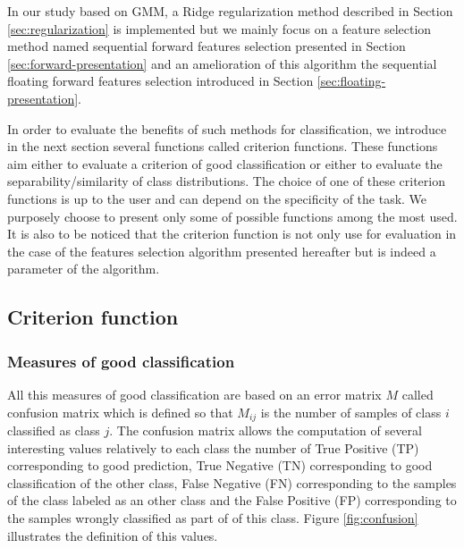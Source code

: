 \documentclass[a4paper,11pt,DIV=16]{scrartcl}
\begin{document}
    In our study based on GMM, a Ridge regularization method described in Section \ref{sec:regularization} is implemented but we mainly focus on a feature selection method named sequential forward features selection presented in Section \ref{sec:forward-presentation} and an amelioration of this algorithm the sequential floating forward features selection introduced in Section \ref{sec:floating-presentation}.

    In order to evaluate the benefits of such methods for classification, we introduce in the next section several functions called criterion functions. These functions aim either to evaluate a criterion of good classification or either to evaluate the separability/similarity of class distributions. The choice of one of these criterion functions is up to the user and can depend on the specificity of the task. We purposely choose to present only some of possible functions among the most used. It is also to be noticed that the criterion function is not only use for evaluation in the case of the features selection algorithm presented hereafter but is indeed a parameter of the algorithm.

    \subsection{Criterion function}
    \label{sec:criterion}

        \subsubsection{Measures of good classification}

        All this measures of good classification are based on an error matrix $M$ called confusion matrix which is defined so that $M_{ij}$ is the number of samples of class $i$ classified as class $j$. The confusion matrix allows the computation of several interesting values relatively to each class the number of True Positive (TP) corresponding to good prediction, True Negative (TN) corresponding to good classification of the other class, False Negative (FN) corresponding to the samples of the class labeled as an other class and the False Positive (FP) corresponding to the samples wrongly classified as part of of this class. Figure \ref{fig:confusion} illustrates the definition of this values.
\end{document}
